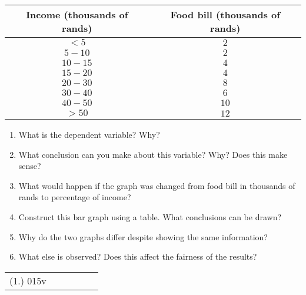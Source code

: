 {\begin{center}
\begin{tabular}{|c|c|}
\hline
Income (thousands of rands) & Food bill (thousands of rands) \\ 
\hline
 $<5$  & $2$  \\
 $5-10$  & $2$  \\
 $10-15$ & $4$  \\
 $15-20$ & $4$  \\
 $20-30$ & $8$  \\
 $30-40$ & $6$  \\
 $40-50$ & $10$ \\
 $>50$ & $12$ \\
\hline
\end{tabular}
\end{center}

\begin{enumerate}
\item What is the dependent variable? Why?
\item What conclusion can you make about this variable? Why? Does this make sense? 
\item What would happen if the graph was changed from food bill in thousands of rands to percentage of income?
\item Construct this bar graph using a table. What conclusions can be drawn?
\item Why do the two graphs differ despite showing the same information?
\item What else is observed? Does this affect the fairness of the results? 
\end{enumerate}

\practiceinfo
\par \begin{tabular}[h]{cccccc}
(1.)	015v	&
\end{tabular}}
